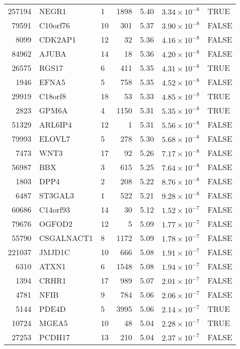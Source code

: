 \begin{table}[ht]
\begin{adjustbox}{totalheight=10in}
\begin{tabular}{rllrrrl}
  257194 & NEGR1 & 1 & 1898 & 5.40 & $3.34 \times 10^{-8}$ & TRUE \\ 
  79591 & C10orf76 & 10 & 301 & 5.37 & $3.90 \times 10^{-8}$ & FALSE \\ 
  8099 & CDK2AP1 & 12 &  32 & 5.36 & $4.16 \times 10^{-8}$ & FALSE \\ 
  84962 & AJUBA & 14 &  18 & 5.36 & $4.20 \times 10^{-8}$ & FALSE \\ 
  26575 & RGS17 & 6 & 411 & 5.35 & $4.31 \times 10^{-8}$ & TRUE \\ 
  1946 & EFNA5 & 5 & 758 & 5.35 & $4.52 \times 10^{-8}$ & FALSE \\ 
  29919 & C18orf8 & 18 &  53 & 5.33 & $4.85 \times 10^{-8}$ & TRUE \\ 
  2823 & GPM6A & 4 & 1150 & 5.31 & $5.35 \times 10^{-8}$ & TRUE \\ 
  51329 & ARL6IP4 & 12 &   1 & 5.31 & $5.56 \times 10^{-8}$ & FALSE \\ 
  79993 & ELOVL7 & 5 & 278 & 5.30 & $5.68 \times 10^{-8}$ & FALSE \\ 
  7473 & WNT3 & 17 &  92 & 5.26 & $7.17 \times 10^{-8}$ & FALSE \\ 
  56987 & BBX & 3 & 615 & 5.25 & $7.64 \times 10^{-8}$ & FALSE \\ 
  1803 & DPP4 & 2 & 208 & 5.22 & $8.76 \times 10^{-8}$ & FALSE \\ 
  6487 & ST3GAL3 & 1 & 522 & 5.21 & $9.28 \times 10^{-8}$ & FALSE \\ 
  60686 & C14orf93 & 14 &  30 & 5.12 & $1.52 \times 10^{-7}$ & FALSE \\ 
  79676 & OGFOD2 & 12 &   5 & 5.09 & $1.77 \times 10^{-7}$ & FALSE \\ 
  55790 & CSGALNACT1 & 8 & 1172 & 5.09 & $1.78 \times 10^{-7}$ & FALSE \\ 
  221037 & JMJD1C & 10 & 666 & 5.08 & $1.91 \times 10^{-7}$ & FALSE \\ 
  6310 & ATXN1 & 6 & 1548 & 5.08 & $1.94 \times 10^{-7}$ & FALSE \\ 
  1394 & CRHR1 & 17 & 989 & 5.07 & $2.01 \times 10^{-7}$ & FALSE \\ 
  4781 & NFIB & 9 & 784 & 5.06 & $2.06 \times 10^{-7}$ & FALSE \\ 
  5144 & PDE4D & 5 & 3995 & 5.06 & $2.14 \times 10^{-7}$ & TRUE \\ 
  10724 & MGEA5 & 10 &  48 & 5.04 & $2.28 \times 10^{-7}$ & TRUE \\ 
  27253 & PCDH17 & 13 & 210 & 5.04 & $2.37 \times 10^{-7}$ & FALSE \\ 

\end{tabular}
\end{adjustbox}
\end{table}
